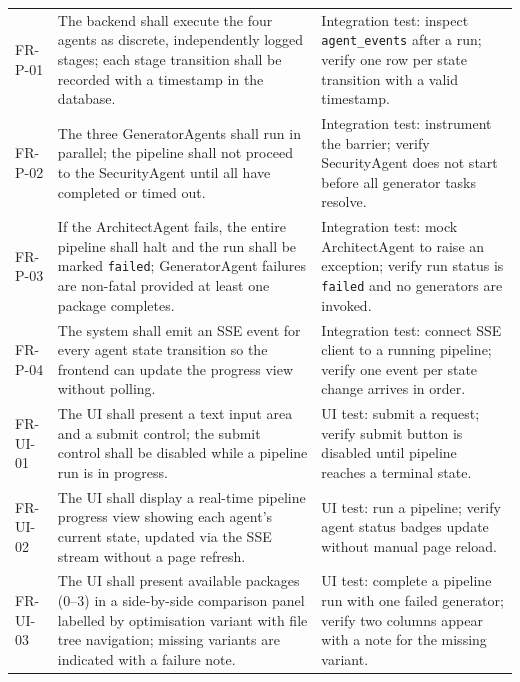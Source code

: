 \begin{longtable}{@{}p{}p{}p{}@{}}
\midrule

FR-P-01 & The backend shall execute the four agents as discrete,
  independently logged stages; each stage transition shall be recorded
  with a timestamp in the database. &
  Integration test: inspect \texttt{agent\_events} after a run; verify
  one row per state transition with a valid timestamp. \\

FR-P-02 & The three GeneratorAgents shall run in parallel; the pipeline
  shall not proceed to the SecurityAgent until all have completed or
  timed out. &
  Integration test: instrument the barrier; verify SecurityAgent does
  not start before all generator tasks resolve. \\

FR-P-03 & If the ArchitectAgent fails, the entire pipeline shall halt and
  the run shall be marked \texttt{failed}; GeneratorAgent failures are
  non-fatal provided at least one package completes. &
  Integration test: mock ArchitectAgent to raise an exception; verify
  run status is \texttt{failed} and no generators are invoked. \\

FR-P-04 & The system shall emit an SSE event for every agent state
  transition so the frontend can update the progress view without
  polling. &
  Integration test: connect SSE client to a running pipeline; verify
  one event per state change arrives in order. \\

\midrule

FR-UI-01 & The UI shall present a text input area and a submit control;
  the submit control shall be disabled while a pipeline run is in
  progress. &
  UI test: submit a request; verify submit button is disabled until
  pipeline reaches a terminal state. \\

FR-UI-02 & The UI shall display a real-time pipeline progress view showing
  each agent's current state, updated via the SSE stream without a page
  refresh. &
  UI test: run a pipeline; verify agent status badges update without
  manual page reload. \\

FR-UI-03 & The UI shall present available packages (0--3) in a
  side-by-side comparison panel labelled by optimisation variant with
  file tree navigation; missing variants are indicated with a failure
  note. &
  UI test: complete a pipeline run with one failed generator; verify
  two columns appear with a note for the missing variant. \\


\end{longtable}
